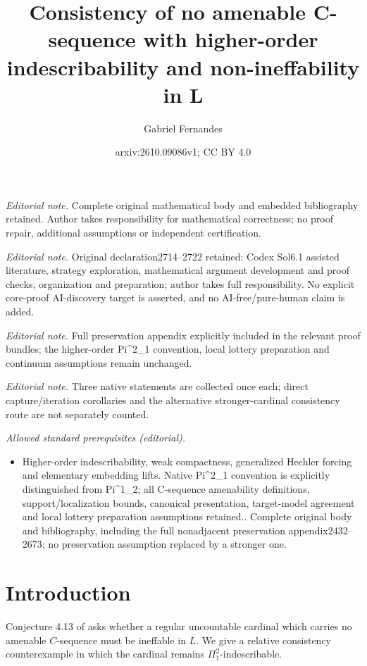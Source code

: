 \documentclass[10pt,a4paper]{amsart}
\title{Consistency of no amenable C-sequence with higher-order indescribability and non-ineffability in L}
\author{Gabriel Fernandes}
\date{arxiv:2610.09086v1; CC BY 4.0}
\theoremstyle{definition}
\theoremstyle{remark}
\begin{document}
\maketitle
\noindent\textit{Editorial note.} Complete original mathematical body and embedded bibliography retained. Author takes responsibility for mathematical correctness; no proof repair, additional assumptions or independent certification.\par\medskip
\noindent\textit{Editorial note.} Original declaration2714--2722 retained: Codex Sol6.1 assisted literature, strategy exploration, mathematical argument development and proof checks, organization and preparation; author takes full responsibility. No explicit core-proof AI-discovery target is asserted, and no AI-free/pure-human claim is added.\par\medskip
\noindent\textit{Editorial note.} Full preservation appendix explicitly included in the relevant proof bundles; the higher-order Pi\textasciicircum{}2\_1 convention, local lottery preparation and continuum assumptions remain unchanged.\par\medskip
\noindent\textit{Editorial note.} Three native statements are collected once each; direct capture/iteration corollaries and the alternative stronger-cardinal consistency route are not separately counted.\par\medskip
\noindent\textit{Allowed standard prerequisites (editorial).}\begin{itemize}
\item Higher-order indescribability, weak compactness, generalized Hechler forcing and elementary embedding lifts. Native Pi\textasciicircum{}2\_1 convention is explicitly distinguished from Pi\textasciicircum{}1\_2; all C-sequence amenability definitions, support/localization bounds, canonical presentation, target-model agreement and local lottery preparation assumptions retained.. Complete original body and bibliography, including the full nonadjacent preservation appendix2432--2673; no preservation assumption replaced by a stronger one.
\end{itemize}\medskip
\section{Introduction}\label{sec:introduction}

Conjecture 4.13 of \cite{IR} asks whether a regular uncountable
cardinal which carries no amenable \(C\)-sequence must be
ineffable in \(L\). We give a relative consistency
counterexample in which the cardinal remains
\(\Pi^2_1\)-indescribable. 
\end{document}

